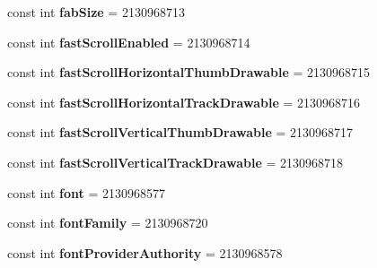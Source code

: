 \begin{DoxyCompactItemize}
\item 
\mbox{\label{classst_delivery_1_1_resource_1_1_attribute_a17b9a121dd80f24c701b2388235cc67b}} 
const int {\bfseries fab\+Size} = 2130968713
\item 
\mbox{\label{classst_delivery_1_1_resource_1_1_attribute_afe49f55bb96f7a45bff29c9cb5fee14e}} 
const int {\bfseries fast\+Scroll\+Enabled} = 2130968714
\item 
\mbox{\label{classst_delivery_1_1_resource_1_1_attribute_a0806c14da738e049e62c0c0cc6dd9a9a}} 
const int {\bfseries fast\+Scroll\+Horizontal\+Thumb\+Drawable} = 2130968715
\item 
\mbox{\label{classst_delivery_1_1_resource_1_1_attribute_af35f8b245fd6282c6c0061fe1650a840}} 
const int {\bfseries fast\+Scroll\+Horizontal\+Track\+Drawable} = 2130968716
\item 
\mbox{\label{classst_delivery_1_1_resource_1_1_attribute_a4c515238a42152aea9be8f7ba9be4cb0}} 
const int {\bfseries fast\+Scroll\+Vertical\+Thumb\+Drawable} = 2130968717
\item 
\mbox{\label{classst_delivery_1_1_resource_1_1_attribute_afbcd4ab90115c975160721365060ea0f}} 
const int {\bfseries fast\+Scroll\+Vertical\+Track\+Drawable} = 2130968718
\item 
\mbox{\label{classst_delivery_1_1_resource_1_1_attribute_a41b800d2a5ac61c109ae0c274074c78b}} 
const int {\bfseries font} = 2130968577
\item 
\mbox{\label{classst_delivery_1_1_resource_1_1_attribute_ab9fd8696efd45c238edde047f8567c33}} 
const int {\bfseries font\+Family} = 2130968720
\item 
\mbox{\label{classst_delivery_1_1_resource_1_1_attribute_a70bce46a754c2ff17177cdae47328fc7}} 
const int {\bfseries font\+Provider\+Authority} = 2130968578

\end{DoxyCompactItemize}
